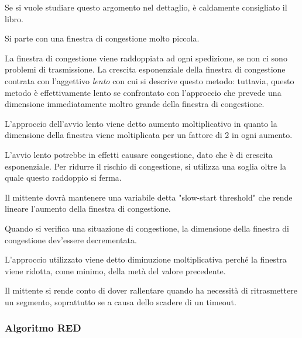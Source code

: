             Se si vuole studiare questo argomento nel dettaglio, è caldamente consigliato il libro.
            
            
                Si parte con una finestra di congestione molto piccola. 
                
                La finestra di congestione viene raddoppiata ad ogni spedizione, se non ci sono problemi di trasmissione. La crescita esponenziale della finestra di congestione contrata con l'aggettivo \textit{lento} con cui si descrive questo metodo: tuttavia, questo metodo è effettivamente lento se confrontato con l'approccio che prevede una dimensione immediatamente moltro grande della finestra di congestione. 
                
                L'approccio dell'avvio lento viene detto aumento moltiplicativo in quanto la dimensione della finestra viene moltiplicata per un fattore di 2 in ogni aumento.
                
            
                L'avvio lento potrebbe in effetti causare congestione, dato che è di crescita esponenziale. Per ridurre il rischio di congestione, si utilizza una soglia oltre la quale questo raddoppio si ferma. 
                
                Il mittente dovrà mantenere una variabile detta "slow-start threshold" che rende lineare l'aumento della finestra di congestione.
            
            
                Quando si verifica una situazione di congestione, la dimensione della finestra di congestione dev'essere decrementata. 
                
                L'approccio utilizzato viene detto diminuzione moltiplicativa perché la finestra viene ridotta, come minimo, della metà del valore precedente. 
                
                Il mittente si rende conto di dover rallentare quando ha necessità di ritrasmettere un segmento, soprattutto se a causa dello scadere di un timeout.
            
        \subsubsection{Algoritmo RED}
        
